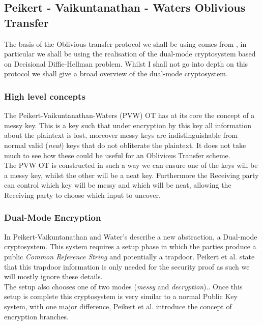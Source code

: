 \documentclass[ %
                    author={Nicholas Tutte},
                supervisor={Prof. Nigel Smart},
                    degree={MEng},
                     title={Secure Two Party Computation},
                  subtitle={A practical comparison of recent protocols},
                      type={Research - GG1K},
                      year={2015} ]{dissertation}
\begin{document}
			\subsection{Peikert - Vaikuntanathan - Waters Oblivious Transfer} \label{sub:dualModeCryptoOT}
				The basis of the Oblivious transfer protocol we shall be using comes from \cite{PVW_OT_2008}, in particular we shall be using the realisation of the dual-mode cryptosystem based on Decisional Diffie-Hellman problem. Whilst I shall not go into depth on this protocol we shall give a broad overview of the dual-mode cryptosystem.

				\subsubsection{High level concepts}
					The Peikert-Vaikuntanathan-Waters (PVW) OT has at its core the concept of a messy key. This is a key such that under encryption by this key all information about the plaintext is lost, moreover messy keys are indistinguishable from normal valid (\emph{neat}) keys that do not obliterate the plaintext. It does not take much to see how these could be useful for an Oblivious Transfer scheme.\\

					The PVW OT is constructed in such a way we can ensure one of the keys will be a messy key, whilst the other will be a neat key. Furthermore the Receiving party can control which key will be messy and which will be neat, allowing the Receiving party to choose which input to uncover.

				\subsubsection{Dual-Mode Encryption}
					In \cite{PVW_OT_2008} Peikert-Vaikuntanathan and Water's describe a new abstraction, a Dual-mode cryptosystem. This system requires a setup phase in which the parties produce a public \emph{Common Reference String} and potentially a trapdoor. Peikert et al. state that this trapdoor information is only needed for the security proof as such we will mostly ignore these details.\\

					The setup also chooses one of two modes (\emph{messy} and \emph{decryption}).. Once this setup is complete this cryptosystem is very similar to a normal Public Key system, with one major difference, Peikert et al. introduce the concept of encryption branches.\\
\end{document}
